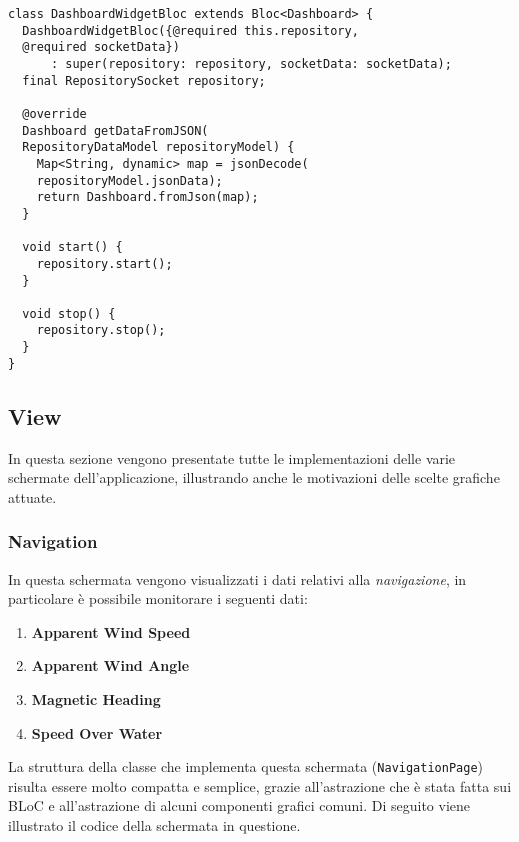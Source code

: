 \begin{lstlisting}
class DashboardWidgetBloc extends Bloc<Dashboard> {
  DashboardWidgetBloc({@required this.repository, 
  @required socketData})
      : super(repository: repository, socketData: socketData);
  final RepositorySocket repository;

  @override
  Dashboard getDataFromJSON(
  RepositoryDataModel repositoryModel) {
    Map<String, dynamic> map = jsonDecode(
    repositoryModel.jsonData);
    return Dashboard.fromJson(map);
  }

  void start() {
    repository.start();
  }

  void stop() {
    repository.stop();
  }
}
\end{lstlisting}

\subsection{View}
In questa sezione vengono presentate tutte le implementazioni delle varie schermate dell'applicazione, illustrando anche le motivazioni delle scelte grafiche attuate.

\subsubsection{Navigation}
In questa schermata vengono visualizzati i dati relativi alla \textit{navigazione}, in particolare è possibile monitorare i seguenti dati:
\begin{enumerate}
	\item \textbf{Apparent Wind Speed}
	\item \textbf{Apparent Wind Angle}
	\item \textbf{Magnetic Heading}
	\item \textbf{Speed Over Water}
\end{enumerate}

La struttura della classe che implementa questa schermata (\verb|NavigationPage|) risulta essere molto compatta e semplice, grazie all'astrazione che è stata fatta sui BLoC e all'astrazione di alcuni componenti grafici comuni. Di seguito viene illustrato il codice della schermata in questione.

\newpage

